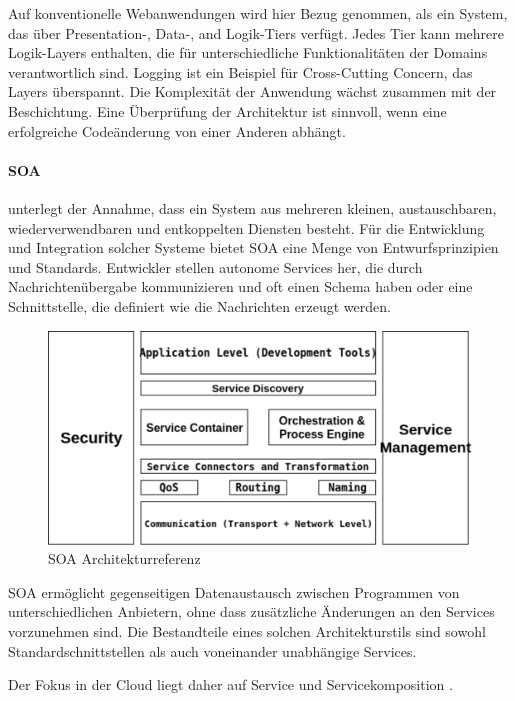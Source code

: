 \documentclass[
12pt,
english,
ngerman,
headsepline,
twoside,
openright,
numbers=noenddot,version=first
]{scrreprt}
\begin{document}
Auf konventionelle Webanwendungen wird hier Bezug genommen, als ein System, das über Presentation-, Data-, and Logik-Tiers verfügt. Jedes Tier kann mehrere Logik-Layers enthalten, die für unterschiedliche Funktionalitäten der Domains verantwortlich sind. Logging ist ein Beispiel für Cross-Cutting Concern, das Layers überspannt. Die Komplexität der Anwendung wächst zusammen mit der Beschichtung.
Eine Überprüfung der Architektur ist sinnvoll, wenn eine erfolgreiche Codeänderung von einer Anderen abhängt.

\paragraph{\acrfull{SOA}}
\label{sec:soa} unterlegt der Annahme, dass ein System aus mehreren kleinen, austauschbaren, wiederverwendbaren und entkoppelten Diensten besteht. Für die Entwicklung und Integration solcher Systeme bietet \acrshort{SOA} eine Menge von Entwurfsprinzipien und Standards. Entwickler stellen autonome Services her, die durch Nachrichtenübergabe kommunizieren und oft einen Schema haben oder eine Schnittstelle, die definiert wie die Nachrichten erzeugt werden.\cite{cloudEssentials}

\begin{figure}[H]	
	\includegraphics[scale=0.80]{./pics/arch-soa.eps}
	\caption{SOA Architekturreferenz\cite{archSoa}}
	\label{pic:arch-soa}
\end{figure}


SOA ermöglicht gegenseitigen Datenaustausch zwischen Programmen von unterschiedlichen Anbietern, ohne dass zusätzliche Änderungen an den Services vorzunehmen sind. Die Bestandteile eines solchen Architekturstils sind sowohl Standardschnittstellen als auch voneinander unabhängige Services\cite{archSoa}. 

Der Fokus in der Cloud liegt daher auf Service und Servicekomposition \cite{cloudEssentials}.
\end{document}
